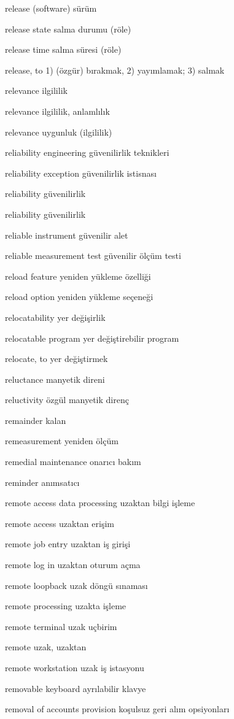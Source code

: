 \documentclass[12pt,fleqn]{article}\usepackage{../../common}
\begin{document}
release (software) sürüm

release state salma durumu (röle)

release time salma süresi (röle)

release, to 1) (özgür) bırakmak, 2) yayımlamak; 3) salmak

relevance ilgililik

relevance ilgililik, anlamlılık

relevance uygunluk (ilgililik)

reliability engineering güvenilirlik teknikleri

reliability exception güvenilirlik istisnası

reliability güvenilirlik

reliability güvenilirlik

reliable instrument güvenilir alet

reliable measurement test güvenilir ölçüm testi

reload feature yeniden yükleme özelliği

reload option yeniden yükleme seçeneği

relocatability yer değişirlik

relocatable program yer değiştirebilir program

relocate, to yer değiştirmek

reluctance manyetik direni

reluctivity özgül manyetik direnç

remainder kalan

remeasurement yeniden ölçüm

remedial maintenance onarıcı bakım

reminder anımsatıcı

remote access data processing uzaktan bilgi işleme

remote access uzaktan erişim

remote job entry uzaktan iş girişi

remote log in uzaktan oturum açma

remote loopback uzak döngü sınaması

remote processing uzakta işleme

remote terminal uzak uçbirim

remote uzak, uzaktan

remote workstation uzak iş istasyonu

removable keyboard ayrılabilir klavye

removal of accounts provision koşulsuz geri alım opsiyonları
\end{document}
